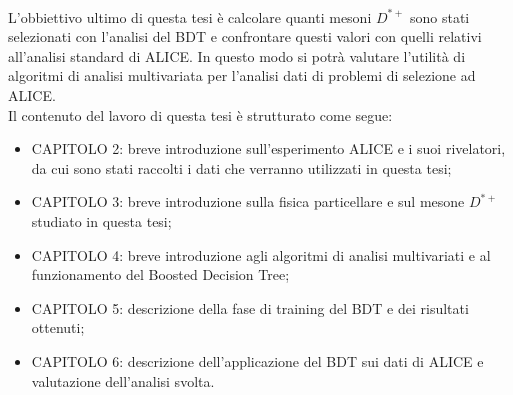 \\L'obbiettivo ultimo di questa tesi è calcolare quanti mesoni $D^{*+}$ sono stati selezionati con l'analisi del BDT e confrontare questi valori con quelli relativi all'analisi standard di ALICE. In questo modo si potrà valutare l'utilità di algoritmi di analisi multivariata per l'analisi dati di problemi di selezione ad ALICE.
\\Il contenuto del lavoro di questa tesi è strutturato come segue:
    \begin{itemize}
        \item CAPITOLO 2: breve introduzione sull'esperimento ALICE e i suoi rivelatori, da cui sono stati raccolti i dati che verranno utilizzati in questa tesi;
        \item CAPITOLO 3: breve introduzione sulla fisica particellare e sul mesone $D^{*+}$ studiato in questa tesi;
        \item CAPITOLO 4: breve introduzione agli algoritmi di analisi multivariati e al funzionamento del Boosted Decision Tree;
        \item CAPITOLO 5: descrizione della fase di training del BDT e dei risultati ottenuti;
        \item CAPITOLO 6: descrizione dell'applicazione del BDT sui dati di ALICE e valutazione dell'analisi svolta.
    \end{itemize}
